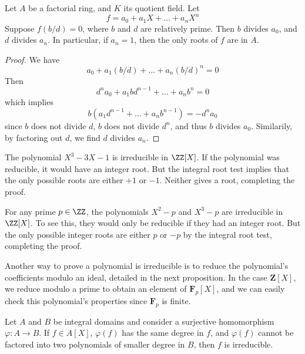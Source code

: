 \begin{theorem}
    Let $A$ be a factorial ring, and $K$ its quotient field. Let
    \[ f = a_0 + a_1 X + \dots + a_n X^n \]
    Suppose $f(b/d) = 0$, where $b$ and $d$ are relatively prime. Then $b$ divides $a_0$, and $d$ divides $a_n$. In particular, if $a_n = 1$, then the only roots of $f$ are in $A$.
\end{theorem}
\begin{proof}
    We have
    \[ a_0 + a_1 (b/d) + \dots + a_n (b/d)^n = 0 \]
    Then
    \[ d^n a_0 + a_1 b d^{n-1} + \dots + a_n b^n = 0 \]
    which implies
    \[ b(a_1 d^{n-1} + \dots + a_n b^{n-1}) = -d^n a_0 \]
    since $b$ does not divide $d$, $b$ does not divide $d^n$, and thus $b$ divides $a_0$. Similarily, by factoring out $d$, we find $d$ divides $a_n$.
\end{proof}

\begin{example}
    The polynomial $X^3 - 3X - 1$ is irreducible in $\ZZ[X]$. If the polynomial was reducible, it would have an integer root. But the integral root test implies that the only possible roots are either $+1$ or $-1$. Neither gives a root, completing the proof.
\end{example}

\begin{example}
    For any prime $p \in \ZZ$, the polynomials $X^2 - p$ and $X^3 - p$ are irreducible in $\ZZ[X]$. To see this, they would only be reducible if they had an integer root. But the only possible integer roots are either $p$ or $-p$ by the integral root test, completing the proof.
\end{example}

Another way to prove a polynomial is irreducible is to reduce the polynomial's coefficients modulo an ideal, detailed in the next proposition. In the case $\mathbf{Z}[X]$, we reduce modulo a prime to obtain an element of $\mathbf{F}_p[X]$, and we can easily check this polynomial's properties since $\mathbf{F}_p$ is finite.

\begin{theorem}
    Let $A$ and $B$ be integral domains and consider a surjective homomorphism $\varphi: A \to B$. If $f \in A[X]$, $\varphi(f)$ has the same degree in $f$, and $\varphi(f)$ cannot be factored into two polynomials of smaller degree in $B$, then $f$ is irreducible.
\end{theorem}

